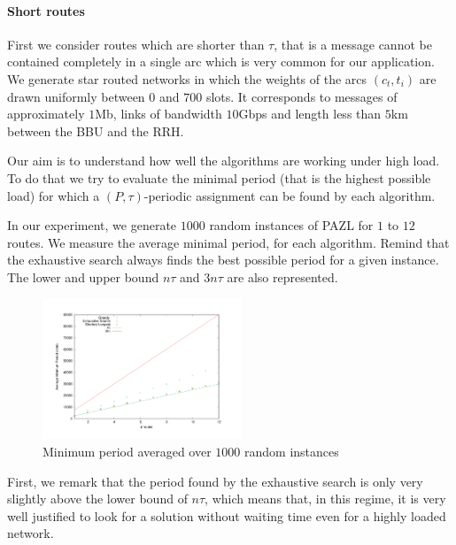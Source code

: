\documentclass[10pt, conference, letterpaper]{IEEEtran}
\begin{document}
      \paragraph{Short routes}
      
      First we consider routes which are shorter than $\tau$, that is a message cannot be contained completely in a single arc which is very common for our application. We generate star routed networks in which the weights of the arcs $(c_t,t_i)$ are drawn uniformly between $0$ and $700$ slots. It corresponds to messages of approximately $1$Mb, links of bandwidth $10$Gbps and length less than $5$km between the BBU and the RRH. 
      
      Our aim is to understand how well the algorithms are working under high load. To do that we try to evaluate the minimal period (that is the highest possible load) for which a $(P,\tau)$-periodic assignment can be found by each algorithm. 
      
      In our experiment, we generate $1000$ random instances of PAZL for $1$ to $12$ routes. 
      We measure the average minimal period, for each algorithm. Remind that the exhaustive search always finds the best possible period for a given instance. The lower and upper bound $n\tau$ and $3n\tau$ are also represented.
      
      
        
      \begin{figure}

      \begin{center}
	 \hspace{-0.5cm}\includegraphics[width=0.53\textwidth]{periode_petite.pdf}
      \end{center}
      \caption{Minimum period averaged over $1000$ random instances}
      \end{figure}
      
      First, we remark that the period found by the exhaustive search is only very slightly above the lower bound of $n\tau$, which means that, in this regime, it is very well justified to look for a solution without waiting time even for a highly loaded network. 
      
\end{document}
